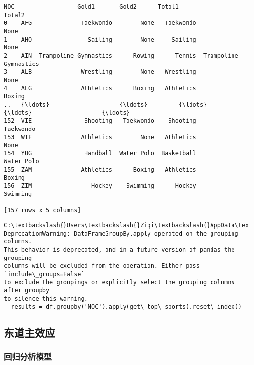 \documentclass[11pt]{article}
\begin{document}
    \begin{Verbatim}[commandchars=\\\{\}]
     NOC                  Gold1       Gold2      Total1                 Total2
0    AFG              Taekwondo        None   Taekwondo                   None
1    AHO                Sailing        None     Sailing                   None
2    AIN  Trampoline Gymnastics      Rowing      Tennis  Trampoline Gymnastics
3    ALB              Wrestling        None   Wrestling                   None
4    ALG              Athletics      Boxing   Athletics                 Boxing
..   {\ldots}                    {\ldots}         {\ldots}         {\ldots}                    {\ldots}
152  VIE               Shooting   Taekwondo    Shooting              Taekwondo
153  WIF              Athletics        None   Athletics                   None
154  YUG               Handball  Water Polo  Basketball             Water Polo
155  ZAM              Athletics      Boxing   Athletics                 Boxing
156  ZIM                 Hockey    Swimming      Hockey               Swimming

[157 rows x 5 columns]
    \end{Verbatim}

    \begin{Verbatim}[commandchars=\\\{\}]
C:\textbackslash{}Users\textbackslash{}Ziqi\textbackslash{}AppData\textbackslash{}Local\textbackslash{}Temp\textbackslash{}ipykernel\_30472\textbackslash{}3729593612.py:31:
DeprecationWarning: DataFrameGroupBy.apply operated on the grouping columns.
This behavior is deprecated, and in a future version of pandas the grouping
columns will be excluded from the operation. Either pass `include\_groups=False`
to exclude the groupings or explicitly select the grouping columns after groupby
to silence this warning.
  results = df.groupby('NOC').apply(get\_top\_sports).reset\_index()
    \end{Verbatim}

    \subsection{东道主效应}\label{ux4e1cux9053ux4e3bux6548ux5e94}

    \subsubsection{回归分析模型}\label{ux56deux5f52ux5206ux6790ux6a21ux578b}
\end{document}

